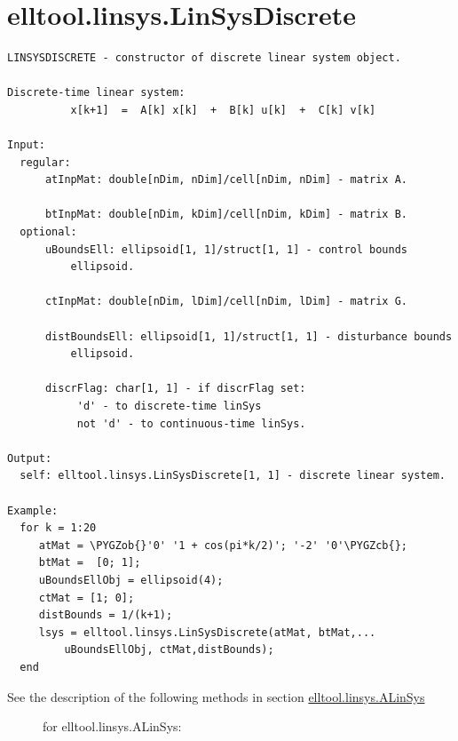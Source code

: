 \documentclass[letterpaper,10pt,english]{sphinxmanual}
\def\PYGZob{\char`\{}
\def\PYGZcb{\char`\}}
\begin{document}
\section{elltool.linsys.LinSysDiscrete}
\label{chap_func:elltool-linsys-linsysdiscrete}
\begin{Verbatim}[commandchars=\\\{\}]
LINSYSDISCRETE - constructor of discrete linear system object.

Discrete-time linear system:
          x[k+1]  =  A[k] x[k]  +  B[k] u[k]  +  C[k] v[k]

Input:
  regular:
      atInpMat: double[nDim, nDim]/cell[nDim, nDim] - matrix A.

      btInpMat: double[nDim, kDim]/cell[nDim, kDim] - matrix B.
  optional:
      uBoundsEll: ellipsoid[1, 1]/struct[1, 1] - control bounds
          ellipsoid.

      ctInpMat: double[nDim, lDim]/cell[nDim, lDim] - matrix G.

      distBoundsEll: ellipsoid[1, 1]/struct[1, 1] - disturbance bounds
          ellipsoid.

      discrFlag: char[1, 1] - if discrFlag set:
           'd' - to discrete-time linSys
           not 'd' - to continuous-time linSys.

Output:
  self: elltool.linsys.LinSysDiscrete[1, 1] - discrete linear system.

Example:
  for k = 1:20
     atMat = \PYGZob{}'0' '1 + cos(pi*k/2)'; '-2' '0'\PYGZcb{};
     btMat =  [0; 1];
     uBoundsEllObj = ellipsoid(4);
     ctMat = [1; 0];
     distBounds = 1/(k+1);
     lsys = elltool.linsys.LinSysDiscrete(atMat, btMat,...
         uBoundsEllObj, ctMat,distBounds);
  end
\end{Verbatim}
\begin{description}
\item[{See the description of the following methods in section {\hyperref[chap_func:elltool-linsys-alinsys]{elltool.linsys.ALinSys}}}] \leavevmode
for elltool.linsys.ALinSys:

\end{description}
\end{document}
